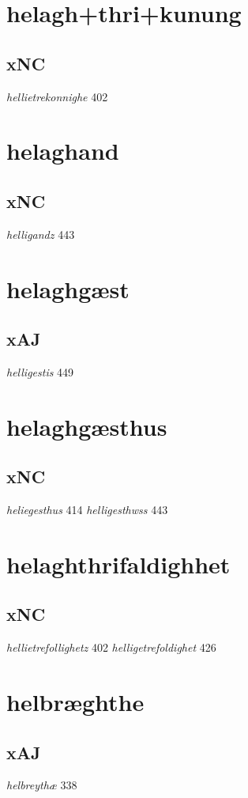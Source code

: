 \documentclass[a4paper,twocolumn]{article}
\begin{document}
\section{helagh+thri+kunung}
\label{sec:org711a423}
\subsection{xNC}
\label{sec:org3f31fde}
\emph{hellietrekonnighe} 402 
\section{helaghand}
\label{sec:orgb7e5b4c}
\subsection{xNC}
\label{sec:orgbd5b65d}
\emph{helligandz} 443 
\section{helaghgæst}
\label{sec:orga2d1fb6}
\subsection{xAJ}
\label{sec:org0ea28a1}
\emph{helligestis} 449 
\section{helaghgæsthus}
\label{sec:orge0897e6}
\subsection{xNC}
\label{sec:orgb98adbb}
\emph{heliegesthus} 414 \emph{helligesthwss} 443 
\section{helaghthrifaldighhet}
\label{sec:org03e2b15}
\subsection{xNC}
\label{sec:orgebf0fc8}
\emph{hellietrefollighetz} 402 \emph{helligetrefoldighet} 426 
\section{helbræghthe}
\label{sec:org6c8bbc4}
\subsection{xAJ}
\label{sec:org53b5263}
\emph{helbreythæ} 338 
\end{document}
